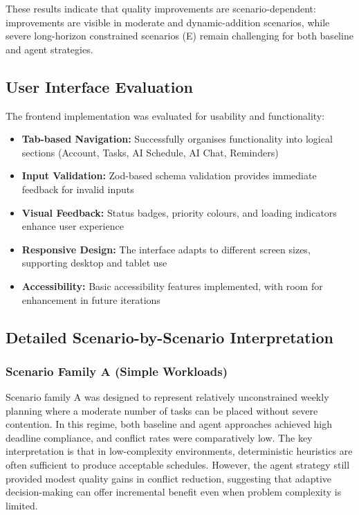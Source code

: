 \documentclass[12pt]{article}
\begin{document}
These results indicate that quality improvements are scenario-dependent: improvements are visible in moderate and dynamic-addition scenarios, while severe long-horizon constrained scenarios (E) remain challenging for both baseline and agent strategies.

\subsection{User Interface Evaluation}

The frontend implementation was evaluated for usability and functionality:

\begin{itemize}
    \item \textbf{Tab-based Navigation:} Successfully organises functionality into logical sections (Account, Tasks, AI Schedule, AI Chat, Reminders)
    \item \textbf{Input Validation:} Zod-based schema validation provides immediate feedback for invalid inputs
    \item \textbf{Visual Feedback:} Status badges, priority colours, and loading indicators enhance user experience
    \item \textbf{Responsive Design:} The interface adapts to different screen sizes, supporting desktop and tablet use
    \item \textbf{Accessibility:} Basic accessibility features implemented, with room for enhancement in future iterations
\end{itemize}

\subsection{Detailed Scenario-by-Scenario Interpretation}
\subsubsection{Scenario Family A (Simple Workloads)}
Scenario family A was designed to represent relatively unconstrained weekly planning where a moderate number of tasks can be placed without severe contention. In this regime, both baseline and agent approaches achieved high deadline compliance, and conflict rates were comparatively low. The key interpretation is that in low-complexity environments, deterministic heuristics are often sufficient to produce acceptable schedules. However, the agent strategy still provided modest quality gains in conflict reduction, suggesting that adaptive decision-making can offer incremental benefit even when problem complexity is limited.
\end{document}
